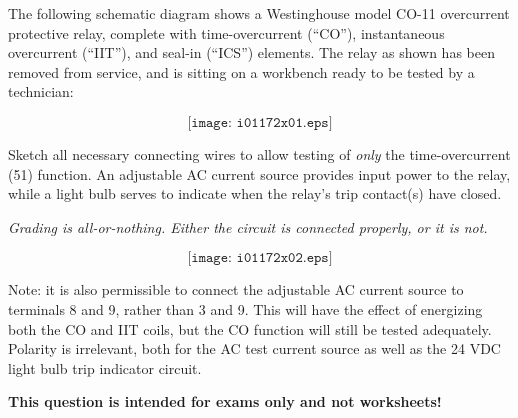 

The following schematic diagram shows a Westinghouse model CO-11 overcurrent protective relay, complete with time-overcurrent (``CO''), instantaneous overcurrent (``IIT''), and seal-in (``ICS'') elements.  The relay as shown has been removed from service, and is sitting on a workbench ready to be tested by a technician:

$$\texttt{[image: i01172x01.eps]}$$

Sketch all necessary connecting wires to allow testing of {\it only} the time-overcurrent (51) function.  An adjustable AC current source provides input power to the relay, while a light bulb serves to indicate when the relay's trip contact(s) have closed.







{\it Grading is all-or-nothing.  Either the circuit is connected properly, or it is not.}  

$$\texttt{[image: i01172x02.eps]}$$

Note: it is also permissible to connect the adjustable AC current source to terminals 8 and 9, rather than 3 and 9.  This will have the effect of energizing both the CO and IIT coils, but the CO function will still be tested adequately.  Polarity is irrelevant, both for the AC test current source as well as the 24 VDC light bulb trip indicator circuit.
 






{\bf This question is intended for exams only and not worksheets!}



